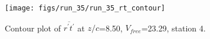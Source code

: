 \begin{figure}[H]
\centering
\texttt{[image: figs/run\_35/run\_35\_rt\_contour]}
\caption{Contour plot of $\overline{r^\prime t^\prime}$ at $z/c$=8.50, $V_{free}$=23.29, station 4.}
\label{fig:run_35_rt_contour}
\end{figure}


